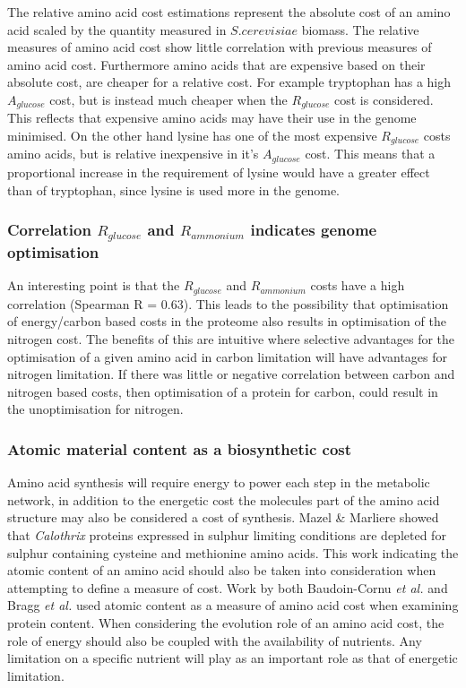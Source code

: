 The relative amino acid cost estimations represent the absolute cost of an amino acid scaled by the quantity measured in $S. cerevisiae$ biomass. The relative measures of amino acid cost show little correlation with previous measures of amino acid cost. Furthermore amino acids that are expensive based on their absolute cost, are cheaper for a relative cost. For example tryptophan has a high $A_{glucose}$ cost, but is instead much cheaper when the $R_{glucose}$ cost is considered. This reflects that expensive amino acids may have their use in the genome minimised. On the other hand lysine has one of the most expensive $R_{glucose}$ costs amino acids, but is relative inexpensive in it's $A_{glucose}$ cost. This means that a proportional increase in the requirement of lysine would have a greater effect than of tryptophan, since lysine is used more in the genome.

\subsubsection{Correlation $R_{glucose}$ and $R_{ammonium}$ indicates genome optimisation}

An interesting point is that the $R_{glucose}$ and $R_{ammonium}$ costs have a high correlation (Spearman R = 0.63). This leads to the possibility that optimisation of energy/carbon based costs in the proteome also results in optimisation of the nitrogen cost. The benefits of this are intuitive where selective advantages for the optimisation of a given amino acid in carbon limitation will have advantages for nitrogen limitation. If there was little or negative correlation between carbon and nitrogen based costs, then optimisation of a protein for carbon, could result in the unoptimisation for nitrogen.

\subsubsection{Atomic material content as a biosynthetic cost}

Amino acid synthesis will require energy to power each step in the metabolic network, in addition to the energetic cost the molecules part of the amino acid structure may also be considered a cost of synthesis. Mazel \& Marliere \cite{mazel1989} showed that \emph{Calothrix} proteins expressed in sulphur limiting conditions are depleted for sulphur containing cysteine and methionine amino acids. This work indicating the atomic content of an amino acid should also be taken into consideration when attempting to define a measure of cost. Work by both Baudoin-Cornu \emph{et al.} \cite{baudoin2001} and Bragg \emph{et al.} \cite{bragg2006} used atomic content as a measure of amino acid cost when examining protein content. When considering the evolution role of an amino acid cost, the role of energy should also be coupled with the availability of nutrients. Any limitation on a specific nutrient will play as an important role as that of energetic limitation.

